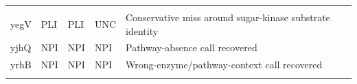 \documentclass[
  11pt,
]{article}
\begin{document}
\begin{longtable}[]{@{}lllll@{}}
\begin{minipage}[t]{0.17\columnwidth}
\end{minipage}\tabularnewline
\begin{minipage}[t]{0.17\columnwidth}\raggedright
yegV\strut
\end{minipage} & \begin{minipage}[t]{0.17\columnwidth}\raggedright
PLI\strut
\end{minipage} & \begin{minipage}[t]{0.17\columnwidth}\raggedright
PLI\strut
\end{minipage} & \begin{minipage}[t]{0.17\columnwidth}\raggedright
UNC\strut
\end{minipage} & \begin{minipage}[t]{0.17\columnwidth}\raggedright
Conservative miss around sugar-kinase substrate identity\strut
\end{minipage}\tabularnewline
\begin{minipage}[t]{0.17\columnwidth}\raggedright
yjhQ\strut
\end{minipage} & \begin{minipage}[t]{0.17\columnwidth}\raggedright
NPI\strut
\end{minipage} & \begin{minipage}[t]{0.17\columnwidth}\raggedright
NPI\strut
\end{minipage} & \begin{minipage}[t]{0.17\columnwidth}\raggedright
NPI\strut
\end{minipage} & \begin{minipage}[t]{0.17\columnwidth}\raggedright
Pathway-absence call recovered\strut
\end{minipage}\tabularnewline
\begin{minipage}[t]{0.17\columnwidth}\raggedright
yrhB\strut
\end{minipage} & \begin{minipage}[t]{0.17\columnwidth}\raggedright
NPI\strut
\end{minipage} & \begin{minipage}[t]{0.17\columnwidth}\raggedright
NPI\strut
\end{minipage} & \begin{minipage}[t]{0.17\columnwidth}\raggedright
NPI\strut
\end{minipage} & \begin{minipage}[t]{0.17\columnwidth}\raggedright
Wrong-enzyme/pathway-context call recovered\strut
\end{minipage}\tabularnewline
\begin{minipage}[t]{0.17\columnwidth}\raggedright

\end{minipage}
\end{longtable}
\end{document}
